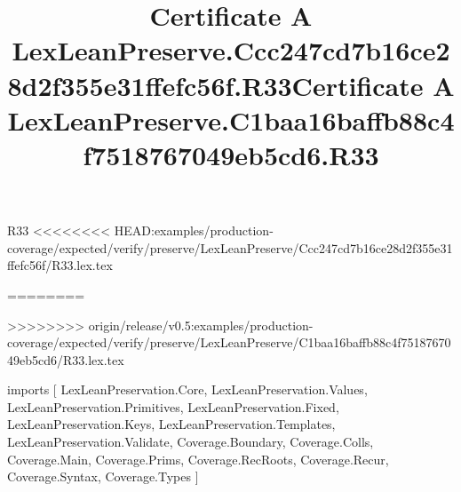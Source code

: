 \begin{lexlean}{R33}
<<<<<<<< HEAD:examples/production-coverage/expected/verify/preserve/LexLeanPreserve/Ccc247cd7b16ce28d2f355e31ffefc56f/R33.lex.tex
\title{Certificate A LexLeanPreserve.Ccc247cd7b16ce28d2f355e31ffefc56f.R33}
========
\title{Certificate A LexLeanPreserve.C1baa16baffb88c4f7518767049eb5cd6.R33}
>>>>>>>> origin/release/v0.5:examples/production-coverage/expected/verify/preserve/LexLeanPreserve/C1baa16baffb88c4f7518767049eb5cd6/R33.lex.tex
\begin{coremodule}
imports [
  LexLeanPreservation.Core,
  LexLeanPreservation.Values,
  LexLeanPreservation.Primitives,
  LexLeanPreservation.Fixed,
  LexLeanPreservation.Keys,
  LexLeanPreservation.Templates,
  LexLeanPreservation.Validate,
  Coverage.Boundary,
  Coverage.Colls,
  Coverage.Main,
  Coverage.Prims,
  Coverage.RecRoots,
  Coverage.Recur,
  Coverage.Syntax,
  Coverage.Types
]


\end{coremodule}
\end{lexlean}
